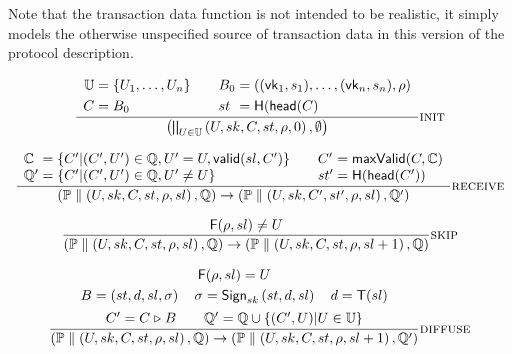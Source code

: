 \documentclass{article}
\newcommand{\sExtend}{\mathrel{\triangleright}}
\newcommand{\sPar}{\mathrel{\parallel}}
\newcommand{\sSystem}[2]{\left( #1, #2 \right)}
\newcommand{\sProcess}[4]{\left( U, sk, #1, #2, #3, #4 \right)}
\newcommand{\sChain}{C}
\newcommand{\sChains}{\mathbb{C}}
\newcommand{\sState}{st}
\newcommand{\sSlot}{sl}
\newcommand{\sLeader}{\mathsf{F}}
\newcommand{\sQueue}{\mathbb{Q}}
\newcommand{\sProcesses}{\mathbb{P}}
\newcommand{\sBlock}[4]{\left( #1 , #2 , #3 , #4 \right)}
\newcommand{\sMaxValid}{\mathsf{maxValid}}
\newcommand{\sValid}{\mathsf{valid}}
\newcommand{\sHash}{\mathsf{H}}
\newcommand{\sHead}{\mathsf{head}}
\newcommand{\sSign}[4]{\mathsf{Sign}_{#1}\left(#2, #3, #4\right)}
\begin{document}
Note that the transaction data function is not intended to be realistic,
it simply models the otherwise unspecified source of transaction data in
this version of the protocol description.

\bigskip

\begin{equation*}
\frac{
  \begin{array}{r@{\;}c@{\;}l@{\qquad}l@{\;}c@{\;}l}
    \mathbb{U} & = & \{U_1, \ldots, U_n\}
    &
    B_0 & = & \left( (\mathsf{vk}_1, s_1), \ldots, (\mathsf{vk}_n, s_n), \rho \right)
    \\[1mm]
    \sChain & = & B_0
    &
    \sState & = & \sHash(\sHead(\sChain)
  \end{array}
}{
  \sSystem{ \bigparallel_{U \in \mathbb{U}} \sProcess{\sChain}{\sState}{\rho}{0}}{\emptyset}
} \textsc{init}
\end{equation*}

\bigskip

\begin{equation*}
\frac{
\begin{array}{l@{\;}c@{\;}l@{\qquad}l@{\;}c@{\;}l}
  \sChains & = & \left\{ \sChain' | (\sChain', U') \in \sQueue, U' = U, \sValid(sl, \sChain') \right\}
  &
  \sChain' & = & \sMaxValid(\sChain, \sChains)
  \\
  \sQueue' & = & \left\{ \sChain' | (\sChain', U') \in \sQueue, U' \neq U \right\}
  &
  \sState' & = & \sHash(\sHead(\sChain'))
\end{array}
}{
  \sSystem{\sProcesses \sPar \sProcess{\sChain}{\sState}{\rho}{\sSlot} }{\sQueue}
\rightarrow
  \sSystem{\sProcesses \sPar \sProcess{\sChain'}{\sState'}{\rho}{\sSlot} }{\sQueue'}
} \textsc{receive}
\end{equation*}

\bigskip

\begin{equation*}
\frac{
    \sLeader(\rho, sl) \neq U
}{
  \sSystem{\sProcesses \sPar \sProcess{\sChain}{\sState}{\rho}{\sSlot}}{\sQueue}
\rightarrow
  \sSystem{\sProcesses \sPar \sProcess{\sChain}{\sState}{\rho}{\sSlot+1}}{\sQueue}
} \textsc{skip}
\end{equation*}

\bigskip

\begin{equation*}
\frac{
    \begin{array}{c}
    \sLeader(\rho, sl) = U
    \\[1mm]
    B = \sBlock{\sState}{d}{\sSlot}{\sigma}
    \quad
    \sigma = \sSign{sk}{\sState}{d}{\sSlot}
    \quad
    d = \mathsf{T}(\sSlot)
    \\[1.5mm]
    \sChain' = \sChain \sExtend B
    \qquad
    \sQueue' = \sQueue \cup \{ (\sChain', U) | U \in \mathbb{U} \}
    \end{array}
}{
  \sSystem{\sProcesses \sPar \sProcess{\sChain}{\sState}{\rho}{\sSlot}}{\sQueue}
\rightarrow
  \sSystem{\sProcesses \sPar \sProcess{\sChain}{\sState}{\rho}{\sSlot+1}}{\sQueue'}
} \textsc{diffuse}
\end{equation*}
\end{document}
